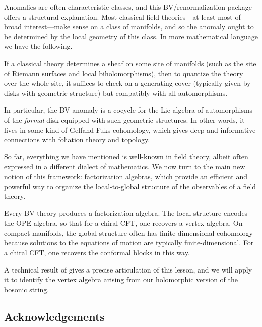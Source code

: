 Anomalies are often characteristic classes, and this BV/renormalization package offers a structural explanation.
Most classical field theories---at least most of broad interest---make sense on a class of manifolds,
and so the anomaly ought to be determined by the local geometry of this class.
In more mathematical language we have the following.

\begin{lesson}
If a classical theory determines a sheaf on some site of manifolds (such as the site of Riemann surfaces and local biholomorphisms), 
then to quantize the theory over the whole site, 
it suffices to check on a generating cover (typically given by disks with geometric structure) but compatibly with all automorphisms.
\end{lesson}

In particular, the BV anomaly is a cocycle for the Lie algebra of automorphisms of the {\em formal} disk equipped with such geometric structures.
In other words, it lives in some kind of Gelfand-Fuks cohomology, which gives deep and informative connections with foliation theory and topology.

So far, everything we have mentioned is well-known in field theory, 
albeit often expressed in a different dialect of mathematics.
We now turn to the main new notion of this framework:
factorization algebras, which provide an efficient and powerful way to organize the local-to-global structure of the observables of a field theory.

\begin{lesson}[\cite{CG1,CG2}]
Every BV theory produces a factorization algebra. 
The local structure encodes the OPE algebra, so that for a chiral CFT, one recovers a vertex algebra. 
On compact manifolds, the global structure often has finite-dimensional cohomology because solutions to the equations of motion are typically finite-dimensional.
For a chiral CFT, one recovers the conformal blocks in this way.
\end{lesson}

A technical result of \cite{CG1} gives a precise articulation of this lesson,
and we will apply it to identify the vertex algebra arising from our holomorphic version of the bosonic string.

\subsection{Acknowledgements}

